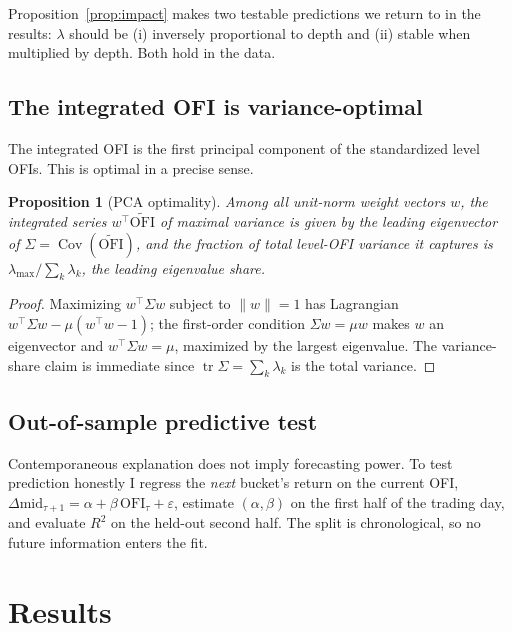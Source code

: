 \documentclass[11pt]{article}
\newtheorem{proposition}{Proposition}
\begin{document}
Proposition~\ref{prop:impact} makes two testable predictions we return to in the
results: $\lambda$ should be (i) inversely proportional to depth and (ii) stable
when multiplied by depth. Both hold in the data.

\subsection{The integrated OFI is variance-optimal}
The integrated OFI is the first principal component of the standardized level OFIs.
This is optimal in a precise sense.
\begin{proposition}[PCA optimality]
Among all unit-norm weight vectors $w$, the integrated series $w^\top
\widetilde{\mathrm{OFI}}$ of maximal variance is given by the leading eigenvector of
$\Sigma = \operatorname{Cov}(\widetilde{\mathrm{OFI}})$, and the fraction of total
level-OFI variance it captures is $\lambda_{\max}/\sum_k \lambda_k$, the leading
eigenvalue share.
\end{proposition}
\begin{proof}
Maximizing $w^\top \Sigma w$ subject to $\|w\|=1$ has Lagrangian
$w^\top\Sigma w - \mu(w^\top w - 1)$; the first-order condition $\Sigma w = \mu w$
makes $w$ an eigenvector and $w^\top\Sigma w = \mu$, maximized by the largest
eigenvalue. The variance-share claim is immediate since $\operatorname{tr}\Sigma =
\sum_k \lambda_k$ is the total variance.
\end{proof}

\subsection{Out-of-sample predictive test}
Contemporaneous explanation does not imply forecasting power. To test prediction
honestly I regress the \emph{next} bucket's return on the current OFI,
$\Delta \mathrm{mid}_{\tau+1} = \alpha + \beta\,\mathrm{OFI}_\tau + \varepsilon$,
estimate $(\alpha,\beta)$ on the first half of the trading day, and evaluate
$R^2$ on the held-out second half. The split is chronological, so no future
information enters the fit.

\section{Results}
\end{document}
